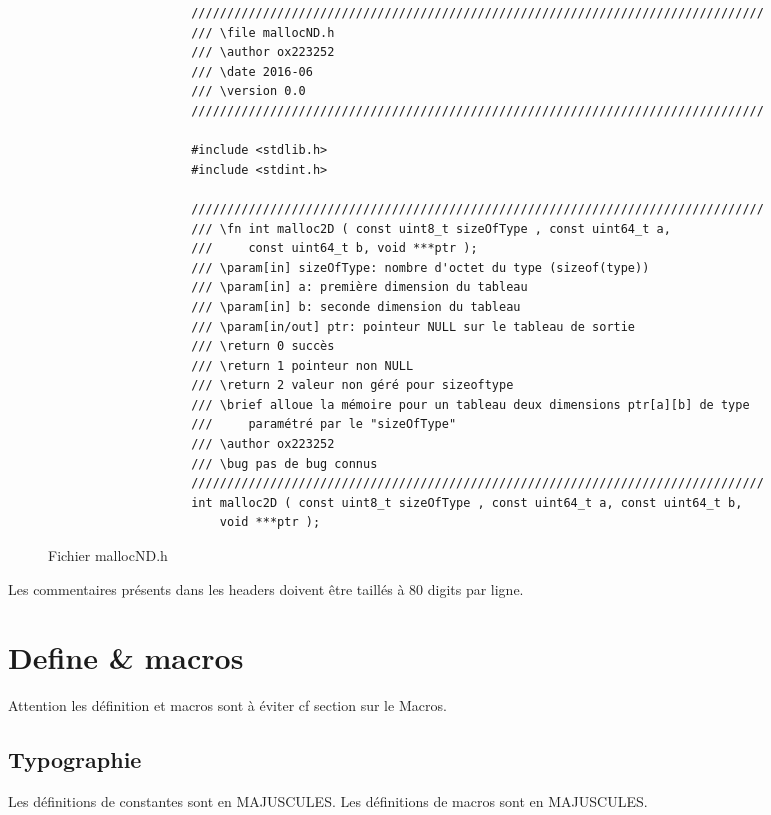 			\begin{figure}[H]
				\begin{changemargin}{-2.5cm}{-2.5cm}
				\begin{tcolorbox}
				\begin{verbatim}
					////////////////////////////////////////////////////////////////////////////////
					/// \file mallocND.h
					/// \author ox223252
					/// \date 2016-06
					/// \version 0.0
					////////////////////////////////////////////////////////////////////////////////

					#include <stdlib.h>
					#include <stdint.h>

					////////////////////////////////////////////////////////////////////////////////
					/// \fn int malloc2D ( const uint8_t sizeOfType , const uint64_t a,
					/// 	const uint64_t b, void ***ptr );
					/// \param[in] sizeOfType: nombre d'octet du type (sizeof(type))
					/// \param[in] a: première dimension du tableau
					/// \param[in] b: seconde dimension du tableau
					/// \param[in/out] ptr: pointeur NULL sur le tableau de sortie
					/// \return 0 succès
					/// \return 1 pointeur non NULL
					/// \return 2 valeur non géré pour sizeoftype
					/// \brief alloue la mémoire pour un tableau deux dimensions ptr[a][b] de type 
					/// 	paramétré par le "sizeOfType"
					/// \author ox223252
					/// \bug pas de bug connus
					////////////////////////////////////////////////////////////////////////////////
					int malloc2D ( const uint8_t sizeOfType , const uint64_t a, const uint64_t b, 
					    void ***ptr );
				\end{verbatim}
				\end{tcolorbox}
				\end{changemargin}
				\caption{Fichier mallocND.h}
			\end{figure}

			Les commentaires présents dans les headers doivent être taillés à 80 digits par ligne.
		
	\section{Define \& macros}
		Attention les définition et macros sont à éviter cf section sur le Macros.

		\subsection{Typographie}
			Les définitions de constantes sont en MAJUSCULES. Les définitions de macros sont en MAJUSCULES.


